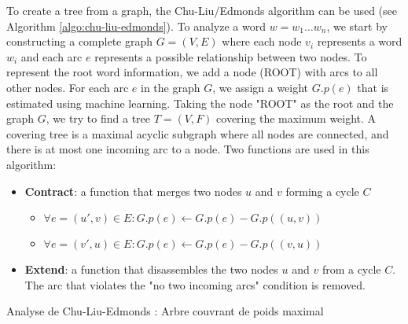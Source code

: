 \documentclass{KodeBook}
\begin{document}
To create a tree from a graph, the Chu-Liu/Edmonds algorithm can be used (see Algorithm \ref{algo:chu-liu-edmonds}).
To analyze a word $w=w_1 \ldots w_n$, we start by constructing a complete graph $G = (V, E)$ where each node $v_i$ represents a word $w_i$ and each arc $e$ represents a possible relationship between two nodes.
To represent the root word information, we add a node (ROOT) with arcs to all other nodes.
For each arc $e$ in the graph $G$, we assign a weight $G.p(e)$ that is estimated using machine learning.
Taking the node "ROOT" as the root and the graph $G$, we try to find a tree $T = (V, F)$ covering the maximum weight.
A covering tree is a maximal acyclic subgraph where all nodes are connected, and there is at most one incoming arc to a node.
Two functions are used in this algorithm:
\begin{itemize}
	\item \textbf{Contract}: a function that merges two nodes $u$ and $v$ forming a cycle $C$
	\begin{itemize}
		\item $\forall e = (u', v) \in E : G.p(e) \leftarrow G.p(e) - G.p((u, v)) $
		\item $\forall e = (v', u) \in E : G.p(e) \leftarrow G.p(e) - G.p((v, u)) $
	\end{itemize}
	\item \textbf{Extend}: a function that disassembles the two nodes $u$ and $v$ from a cycle $C$. The arc that violates the "no two incoming arcs" condition is removed.
\end{itemize}


\begin{algorithm}[ht]
	
	
	\caption{Analyse de Chu-Liu-Edmonds : Arbre couvrant de poids maximal\label{algo:chu-liu-edmonds}}
\end{algorithm}
\end{document}
